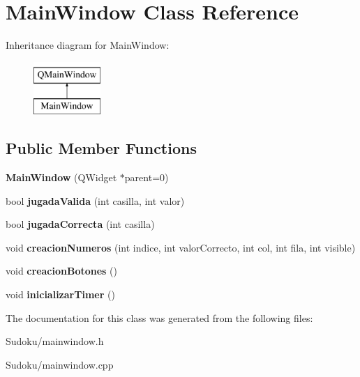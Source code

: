 \hypertarget{class_main_window}{\section{Main\-Window Class Reference}
\label{class_main_window}
}
Inheritance diagram for Main\-Window\-:\begin{figure}[H]
\begin{center}
\leavevmode
\includegraphics[height=2.000000cm]{class_main_window}
\end{center}
\end{figure}
\subsection*{Public Member Functions}
\begin{DoxyCompactItemize}
\item 
\hypertarget{class_main_window_a8b244be8b7b7db1b08de2a2acb9409db}{{\bfseries Main\-Window} (Q\-Widget $\ast$parent=0)}\label{class_main_window_a8b244be8b7b7db1b08de2a2acb9409db}

\item 
\hypertarget{class_main_window_adb7dbe0ece2eaa1a92b3ee1da8ae3327}{bool {\bfseries jugada\-Valida} (int casilla, int valor)}\label{class_main_window_adb7dbe0ece2eaa1a92b3ee1da8ae3327}

\item 
\hypertarget{class_main_window_ab68ff992b159d33b1f80606deabe0361}{bool {\bfseries jugada\-Correcta} (int casilla)}\label{class_main_window_ab68ff992b159d33b1f80606deabe0361}

\item 
\hypertarget{class_main_window_a18e451ac33947c4e8c058a5266daafbd}{void {\bfseries creacion\-Numeros} (int indice, int valor\-Correcto, int col, int fila, int visible)}\label{class_main_window_a18e451ac33947c4e8c058a5266daafbd}

\item 
\hypertarget{class_main_window_af0799066013e5dac6614367dc715d3e4}{void {\bfseries creacion\-Botones} ()}\label{class_main_window_af0799066013e5dac6614367dc715d3e4}

\item 
\hypertarget{class_main_window_ade1681f57a1c4cacefd88030c3f70b23}{void {\bfseries inicializar\-Timer} ()}\label{class_main_window_ade1681f57a1c4cacefd88030c3f70b23}

\end{DoxyCompactItemize}


The documentation for this class was generated from the following files\-:\begin{DoxyCompactItemize}
\item 
Sudoku/mainwindow.\-h\item 
Sudoku/mainwindow.\-cpp\end{DoxyCompactItemize}
